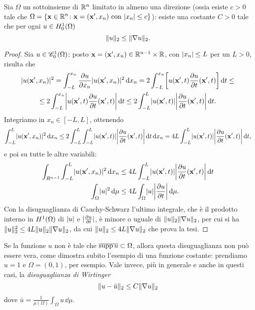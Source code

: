 \begin{teorema} \label{t:disuguaglianza-poincare}
    Sia $\Omega$ un sottoinsieme di $\R^n$ limitato in almeno una direzione (ossia esiste $c>0$ tale che $\Omega=\{\vec x\in\R^n\colon\vec x=(\vec x',x_n)\text{ con }\abs{x_n}\le c\}$): esiste una costante $C>0$ tale che per ogni $u\in\sobHc[1]{\Omega}$
    \begin{equation}
        \norm{u}_2\le\norm{\grad u}_2.
        \label{eq:disuguaglianza-poincare}
    \end{equation}
\end{teorema}
\begin{proof}
    Sia $u\in\contsc[1]{\Omega}$: posto $\vec x=(\vec x',x_n)\in\R^{n-1}\times\R$, con $\abs{x_n}\le L$ per un $L>0$, risulta che
    \begin{multline}
        \abs{u(\vec x',x_n)}^2=
        \int_{-L}^{x_n}\drp{u}{x_n}\abs{u(\vec x',x_n)}^2\,\dd x_n=
        2\int_{-L}^{x_n}\biggl[u(\vec x',t)\drp{u}{t}(\vec x',t)\biggr]\,\dd t\le\\ \le
        2\int_{-L}^{x_n}\abs[\bigg]{u(\vec x',t)\drp{u}{t}(\vec x',t)}\,\dd t\le
        2\int_{-L}^L\abs{u(\vec x',t)}\abs[\bigg]{\drp{u}{t}(\vec x',t)}\,\dd t.
    \end{multline}
    Integriamo in $x_n\in[-L,L]$, ottenendo
    \begin{equation}
        \int_{-L}^L\abs{u(\vec x',x_n)}^2\,\dd x_n\le
        2\int_{-L}^L\int_{-L}^L\abs{u(\vec x',t)}\abs[\bigg]{\drp{u}{t}(\vec x',t)}\,\dd t\,\dd x_n=
        4L\int_{-L}^L\abs{u(\vec x',t)}\abs[\bigg]{\drp{u}{t}(\vec x',t)}\,\dd t,
    \end{equation}
    e poi su tutte le altre variabili:
    \begin{equation}
        \begin{aligned}
            \int_{R^{n-1}}\int_{-L}^L\abs{u(\vec x',x_n)}^2\,\dd x_n &\le 4L\int_{-L}^L\abs{u(\vec x',t)}\abs[\bigg]{\drp{u}{t}(\vec x',t)}\,\dd t\\
            \int_\Omega\abs{u}^2\,\dd\mu                             &\le 4L\int_\Omega\abs{u}\abs[\bigg]{\drp{u}{t}}\,\dd\mu.
        \end{aligned}
    \end{equation}
    Con la disuguaglianza di Cauchy-Schwarz l'ultimo integrale, che è il prodotto interno in $\sobH[1]{\Omega}$ di $\abs{u}$ e $\abs{\drp{u}{t}}$, è minore o uguale di $\norm{u}_2\norm{\grad u}_2$, per cui si ha $\norm{u}_2^2\le 4L\norm{u}_2\norm{\grad u}_2$, da cui $\norm{u}_2\le 4L\norm{\grad u}_2$ che prova la tesi.
\end{proof}
Se la funzione $u$ non è tale che $\clos{\supp u}\subset\Omega$, allora questa disuguaglianza non può essere vera, come dimostra subito l'esempio di una funzione costante: prendiamo $u=1$ e $\Omega=(0,1)$, per esempio.
Vale invece, più in generale e anche in questi casi, la \emph{disuguaglianza di Wirtinger}
\begin{equation}
    \norm{u-\bar{u}}_2\le C\norm{\grad u}_2
    \label{eq:disuguaglianza-wirtinger}
\end{equation}
dove $\bar{u}=\frac1{\mu(\Omega)}\int_\Omega u\,\dd\mu$.

